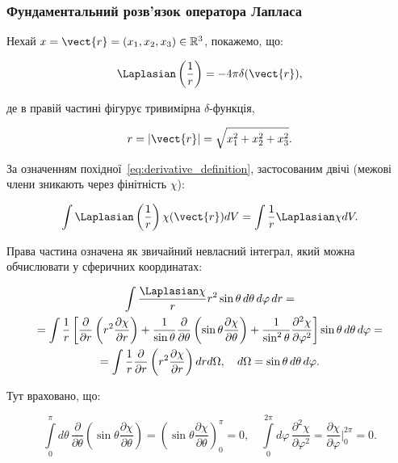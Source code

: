 \subsubsection{Фундаментальний розв'язок оператора Лапласа}

Нехай  \( x = \vect{r} = (x_1, x_2, x_3) \in \mathbb{R}^3 \), покажемо, що:

\begin{equation}\label{eq:laplace_fundamental}
    \Laplasian \left( \frac{1}{r} \right) = -4\pi \delta(\vect{r}),
\end{equation}

де в правій частині фігурує тривимірна \(\delta\)-функція,

\begin{equation*}
r = |\vect{r}| = \sqrt{x_1^2 + x_2^2 + x_3^2}.
\end{equation*}

За означенням похідної~\eqref{eq:derivative_definition}, застосованим двічі (межові члени зникають через фінітність \(\chi\)):

\begin{equation*}
\int \Laplasian \left( \frac{1}{r} \right) \chi(\vect{r}) dV = \int \frac{1}{r} \Laplasian \chi dV.
\end{equation*}

Права частина означена як звичайний невласний інтеграл, який можна обчислювати у сферичних координатах:

\begin{multline*}
\int \frac{\Laplasian \chi}{r}  r^2 \sin \theta \, d\theta \, d\varphi \, dr = \\
=
\int \frac{1}{r} \left[ \frac{\partial}{\partial r} \left( r^2
\frac{\partial \chi}{\partial r} \right) + \frac{1}{\sin \theta} \frac{\partial}{\partial \theta} \left( \sin \theta \frac{\partial \chi}{\partial
\theta} \right) + \frac{1}{\sin^2 \theta} \frac{\partial^2 \chi}{\partial \varphi^2} \right] \sin \theta \, d\theta \, d\varphi =
\\=
\int \frac{1}{r}
\frac{\partial}{\partial r} \left( r^2 \frac{\partial \chi}{\partial r} \right) dr d\Omega, \quad d\Omega = \sin \theta \, d\theta \, d\varphi.
\end{multline*}

Тут враховано, що:

\begin{equation*}
\int\limits_0^\pi d\theta \, \frac{\partial}{\partial \theta} \left( \sin \theta \frac{\partial \chi}{\partial \theta} \right) = \left( \sin \theta
\frac{\partial \chi}{\partial \theta} \right)_0^\pi = 0, \quad \int\limits_0^{2\pi} d\varphi \, \frac{\partial^2 \chi}{\partial \varphi^2} =
\frac{\partial
\chi}{\partial \varphi} \bigg|_0^{2\pi} = 0.
\end{equation*}

